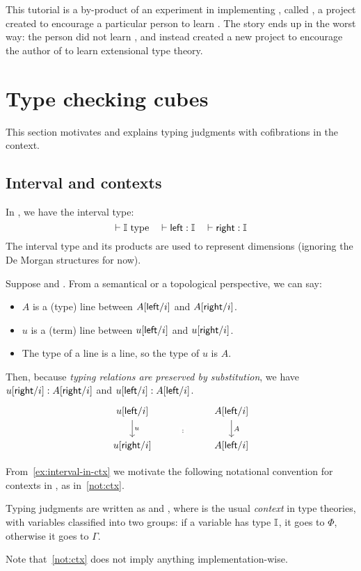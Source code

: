 This tutorial is a by-product of an experiment in implementing \CTT, called \GuestName,
a project created to encourage a particular person to learn \CTT.
The story ends up in the worst way: the person did not learn \CTT, and instead created
a new project to encourage the author of \GuestName{} to learn extensional type theory.

\section{Type checking cubes}\label{sec:tyck-cube}
This section motivates and explains typing judgments with cofibrations in the context.

\subsection{Interval and contexts}\label{sub:interval}
In \CTT, we have the interval type:
\[\vdash \mathbb{I}~\text{type}\quad \vdash \textsf{left}:\mathbb{I} \quad \vdash \textsf{right}:\mathbb{I}\]
The interval type and its products are used to represent dimensions
(ignoring the De Morgan structures for now).
\begin{example}\label{ex:interval-in-ctx}
Suppose  and .
From a semantical or a topological perspective, we can say:
\begin{itemize}
\item $A$ is a (type) line between $A[\textsf{left}/i]$ and $A[\textsf{right}/i]$.
\item $u$ is a (term) line between $u[\textsf{left}/i]$ and $u[\textsf{right}/i]$.
\item The type of a line is a line, so the type of $u$ is $A$.
\end{itemize}
Then, because \emph{typing relations are preserved by substitution},
we have $u[\textsf{right}/i]:A[\textsf{right}/i]$ and $u[\textsf{left}/i]:A[\textsf{left}/i]$.
\[\begin{tikzcd}
	{u[\lcon/i]} & {} & {A[\lcon/i]} \\
	{u[\rcon/i]} & {} & {A[\lcon/i]}
	\arrow["u", from=1-1, to=2-1]
	\arrow["A", from=1-3, to=2-3]
	\arrow["{:}"{description}, draw=none, from=1-2, to=2-2]
\end{tikzcd}\]
\end{example}
From~\cref{ex:interval-in-ctx} we motivate the following notational
convention for contexts in \CTT, as in~\cref{not:ctx}.
\begin{notation}\label{not:ctx}
Typing judgments are written as  and ,
where \fbox{$\Phi;\Gamma$} is the usual \textit{context} in type theories,
with variables classified into two groups: if a variable has type $\mathbb{I}$,
it goes to $\Phi$, otherwise it goes to $\Gamma$.
\end{notation}
Note that~\cref{not:ctx} does not imply anything implementation-wise.

